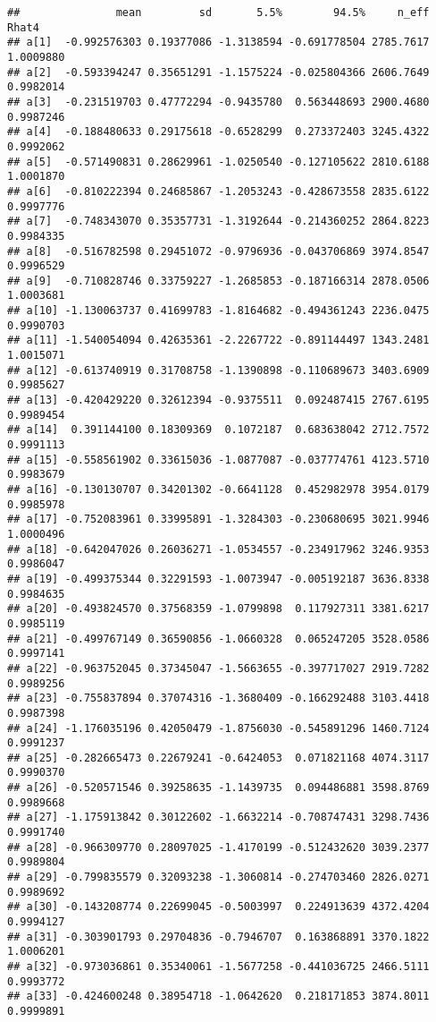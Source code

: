 \documentclass[
]{article}
\begin{document}
\begin{verbatim}
##               mean         sd       5.5%        94.5%     n_eff     Rhat4
## a[1]  -0.992576303 0.19377086 -1.3138594 -0.691778504 2785.7617 1.0009880
## a[2]  -0.593394247 0.35651291 -1.1575224 -0.025804366 2606.7649 0.9982014
## a[3]  -0.231519703 0.47772294 -0.9435780  0.563448693 2900.4680 0.9987246
## a[4]  -0.188480633 0.29175618 -0.6528299  0.273372403 3245.4322 0.9992062
## a[5]  -0.571490831 0.28629961 -1.0250540 -0.127105622 2810.6188 1.0001870
## a[6]  -0.810222394 0.24685867 -1.2053243 -0.428673558 2835.6122 0.9997776
## a[7]  -0.748343070 0.35357731 -1.3192644 -0.214360252 2864.8223 0.9984335
## a[8]  -0.516782598 0.29451072 -0.9796936 -0.043706869 3974.8547 0.9996529
## a[9]  -0.710828746 0.33759227 -1.2685853 -0.187166314 2878.0506 1.0003681
## a[10] -1.130063737 0.41699783 -1.8164682 -0.494361243 2236.0475 0.9990703
## a[11] -1.540054094 0.42635361 -2.2267722 -0.891144497 1343.2481 1.0015071
## a[12] -0.613740919 0.31708758 -1.1390898 -0.110689673 3403.6909 0.9985627
## a[13] -0.420429220 0.32612394 -0.9375511  0.092487415 2767.6195 0.9989454
## a[14]  0.391144100 0.18309369  0.1072187  0.683638042 2712.7572 0.9991113
## a[15] -0.558561902 0.33615036 -1.0877087 -0.037774761 4123.5710 0.9983679
## a[16] -0.130130707 0.34201302 -0.6641128  0.452982978 3954.0179 0.9985978
## a[17] -0.752083961 0.33995891 -1.3284303 -0.230680695 3021.9946 1.0000496
## a[18] -0.642047026 0.26036271 -1.0534557 -0.234917962 3246.9353 0.9986047
## a[19] -0.499375344 0.32291593 -1.0073947 -0.005192187 3636.8338 0.9984635
## a[20] -0.493824570 0.37568359 -1.0799898  0.117927311 3381.6217 0.9985119
## a[21] -0.499767149 0.36590856 -1.0660328  0.065247205 3528.0586 0.9997141
## a[22] -0.963752045 0.37345047 -1.5663655 -0.397717027 2919.7282 0.9989256
## a[23] -0.755837894 0.37074316 -1.3680409 -0.166292488 3103.4418 0.9987398
## a[24] -1.176035196 0.42050479 -1.8756030 -0.545891296 1460.7124 0.9991237
## a[25] -0.282665473 0.22679241 -0.6424053  0.071821168 4074.3117 0.9990370
## a[26] -0.520571546 0.39258635 -1.1439735  0.094486881 3598.8769 0.9989668
## a[27] -1.175913842 0.30122602 -1.6632214 -0.708747431 3298.7436 0.9991740
## a[28] -0.966309770 0.28097025 -1.4170199 -0.512432620 3039.2377 0.9989804
## a[29] -0.799835579 0.32093238 -1.3060814 -0.274703460 2826.0271 0.9989692
## a[30] -0.143208774 0.22699045 -0.5003997  0.224913639 4372.4204 0.9994127
## a[31] -0.303901793 0.29704836 -0.7946707  0.163868891 3370.1822 1.0006201
## a[32] -0.973036861 0.35340061 -1.5677258 -0.441036725 2466.5111 0.9993772
## a[33] -0.424600248 0.38954718 -1.0642620  0.218171853 3874.8011 0.9999891

\end{verbatim}
\end{document}
